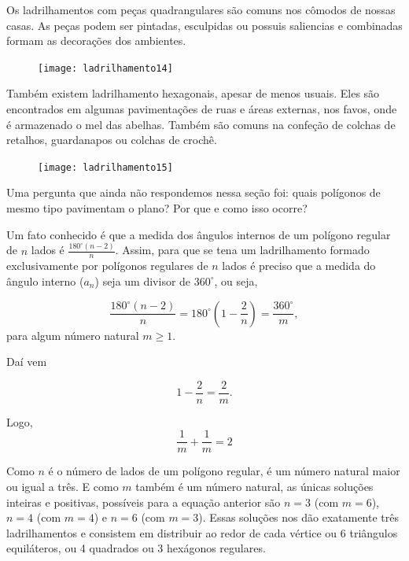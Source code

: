 
Os ladrilhamentos com peças quadrangulares são comuns nos cômodos de nossas casas. As peças podem ser pintadas, esculpidas ou possuis saliencias e combinadas formam as decorações dos ambientes.

\begin{figure}[H]
\centering
\texttt{[image: ladrilhamento14]}
\end{figure}

Também existem ladrilhamento hexagonais, apesar de menos usuais. Eles são encontrados em algumas pavimentações de ruas e áreas externas, nos favos, onde é armazenado o mel das abelhas. Também são comuns na confeção de colchas de retalhos, guardanapos ou colchas de crochê.

\begin{figure}[H]
\centering
\texttt{[image: ladrilhamento15]}
\end{figure}

Uma pergunta que ainda não respondemos nessa seção foi: quais polígonos de mesmo tipo pavimentam o plano? Por que e como isso ocorre?

Um fato conhecido é que a medida dos ângulos internos de um polígono regular de $n$ lados é $\displaystyle \frac{180^{\circ}(n-2)}{n}$. Assim, para que se tena um ladrilhamento formado exclusivamente por polígonos regulares de $n$ lados é preciso que a medida do ângulo interno ($a_n$) seja um divisor de $360^{\circ}$, ou seja,

\begin{equation*}
\frac{180^{\circ}(n-2)}{n}=180^{\circ} \left(1 - \frac{2}{n}\right)=\frac{360^{\circ}}{m},
\end{equation*}
para algum número natural $m\geq1$.

Daí vem

\begin{equation*}
1-\frac{2}{n}=\frac{2}{m}.
\end{equation*}

Logo,
\begin{equation*}
\frac{1}{m}+\frac{1}{m}=2
\end{equation*}

Como $n$ é o número de lados de um polígono regular, é um número natural maior ou igual a três. E como $m$ também é um número natural, as únicas soluções inteiras e positivas, possíveis para a equação anterior são $n=3$ (com $m=6$), $n=4$ (com $m=4$) e $n=6$ (com $m=3$). Essas soluções nos dão exatamente três ladrilhamentos e consistem em distribuir ao redor de cada vértice ou 6 triângulos equiláteros, ou 4 quadrados ou 3 hexágonos regulares.

